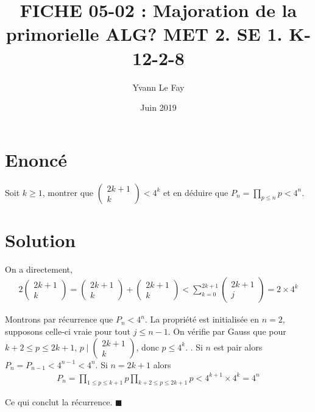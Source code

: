 \documentclass{article}
\newcommand*{\QED}{\hfill\ensuremath{\blacksquare}}%
\begin{document}
\title{FICHE 05-02 : Majoration de la primorielle ALG? MET 2. SE 1. K-12-2-8}
\author{Yvann Le Fay}
\date{Juin 2019}
\maketitle

\section*{Enoncé}
Soit $k\geq 1$, montrer que $\begin{pmatrix}
2k+1\\k
\end{pmatrix}< 4^k$ et en déduire que $P_n = \prod_{p\leq n}p< 4^n$.
\section*{Solution}
On a directement,
\begin{align*}
2\begin{pmatrix}
2k+1\\k
\end{pmatrix}=\begin{pmatrix}
2k+1\\k
\end{pmatrix}+\begin{pmatrix}
2k+1\\
k
\end{pmatrix}<\sum_{k=0}^{2k+1} \begin{pmatrix}
2k+1\\
j
\end{pmatrix}=2\times 4^k
\end{align*}

Montrons par récurrence que $P_n< 4^n$. La propriété est initialisée en $n=2$, supposons celle-ci vraie pour tout $j\leq n-1$. On vérifie par Gauss que pour $k+2\leq p\leq 2k+1$, $p\mid \begin{pmatrix}2k+1\\k\end{pmatrix}$, donc $p\leq 4^k$. . Si $n$ est pair alors $P_{n}=P_{n-1}<4^{n-1}<4^n$. Si $n=2k+1$ alors 
\begin{align*}
P_{n}=\prod_{1\leq p\leq k+1}p \prod_{k+2\leq p \leq 2k+1}p< 4^{k+1}\times 4^{k}=4^n
\end{align*}

Ce qui conclut la récurrence.
\QED
\end{document}
